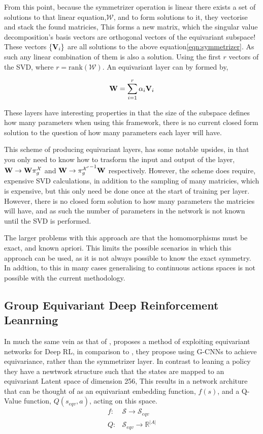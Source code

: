 From this point, because the symmetrizer operation is linear there exists a set of solutions to that linear equation,$\mathcal{W}$, and to form solutions to it, they vectorise and stack the found matricies, This forms a new matrix, which the singular value decomposition's basis vectors are orthogonal vectors of the equivariant subspace! These vectors $\{\mathbf{V}_i\}$ are all solutions to the above equation\ref{eqn:symmetrizer}. As such any linear combination of them is also a solution. Using the first $r$ vectors of the SVD, where $r= \text{rank}(\mathcal{W})$. An equivariant layer can by formed by,

\begin{equation}
	\mathbf{W} = \sum_{i=1}^{r}{\alpha_i\mathbf{V}_i}
\end{equation}

These layers have interesting properties in that the size of the subspace defines how many parameters when using this framework, there is no current closed form solution to the question of how many parameters each layer will have.

This scheme of producing equivariant layers, has some notable upsides, in that you only need to know how to trasform the input and output of the layer, $\mathbf{W} \rightarrow \mathbf{W}\pi_g^\mathcal{X}$ and $\mathbf{W} \rightarrow {\pi_g^{\mathcal{X}'}}^{-1} \mathbf{W}$ respectively. However, the scheme does require, expensive SVD calculations, in addition to the sampling of many matricies, which is expensive, but this only need be done once at the start of training per layer. However, there is no closed form solution to how many parameters the matricies will have, and as such the number of parameters in the network is not known until the SVD is performed.

The larger problems with this approach are that the homomorphisms must be exact, and known apriori. This limits the possible scenarios in which this approach can be used, as it is not always possible to know the exact symmetry. In addtion, to this in many cases generalising to continuous actions spaces is not possible with the current methodology.


\subsection{Group Equivariant Deep Reinforcement Leanrning}
In much the same vein as that of \cite{vanderpol2020mdp}, \cite{mondal2020group} proposes a method of exploiting equivariant networks for Deep RL, in comparison to \cite{vanderpol2020mdp}, they propose using G-CNNs\cite{cohen2016group} to achieve equivariance, rather than the symmetrizer layer. In contrast to leaning a policy they have a newtwork structure such that the states are mapped to an equivariant Latent space of dimension 256, This results in a network architure that can be thought of as an equivariant embedding function, $f(s)$, and a Q-Value function, $Q(s_{eqv}, a)$, acting on this space.
\begin{align}
	f: & \mathcal{S} \rightarrow \mathcal{S}_{eqv}      \\
	Q: & \mathcal{S}_{eqv} \rightarrow \mathbb{R}^{|A|}
\end{align}

